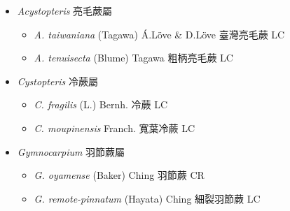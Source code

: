 
  \begin{itemize}
 \item[] \textit{Acystopteris} 亮毛蕨屬
                                
  \begin{itemize}
        \item[] \textit{A. taiwaniana} (Tagawa) Á.Löve \& D.Löve  臺灣亮毛蕨   LC
        \item[] \textit{A. tenuisecta} (Blume) Tagawa  粗柄亮毛蕨   LC
  \end{itemize}
 \item[] \textit{Cystopteris} 冷蕨屬
                                
  \begin{itemize}
        \item[] \textit{C. fragilis} (L.) Bernh.  冷蕨   LC
        \item[] \textit{C. moupinensis} Franch.  寬葉冷蕨   LC
  \end{itemize}
 \item[] \textit{Gymnocarpium} 羽節蕨屬
                                
  \begin{itemize}
        \item[] \textit{G. oyamense} (Baker) Ching  羽節蕨   CR
        \item[] \textit{G. remote-pinnatum} (Hayata) Ching  細裂羽節蕨   LC
  \end{itemize}
  \end{itemize}

